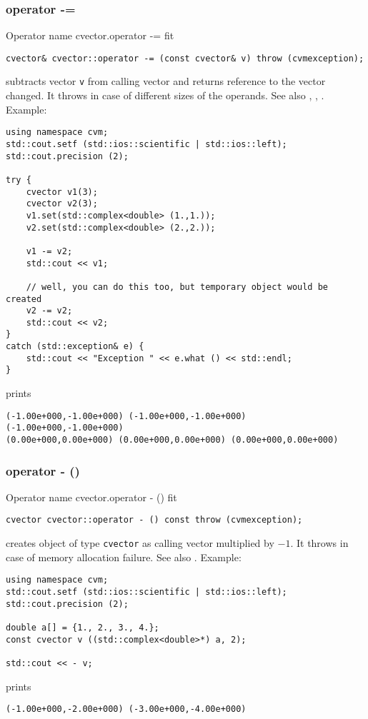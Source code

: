 \subsubsection{operator -=}
Operator%
\pdfdest name {cvector.operator -=} fit
\begin{verbatim}
cvector& cvector::operator -= (const cvector& v) throw (cvmexception);
\end{verbatim}
subtracts vector \verb"v" from  calling vector  
and returns  reference to
the vector changed.
It throws  
in case of different sizes of the operands.
See also ,
,
.
Example:
\begin{Verbatim}
using namespace cvm;
std::cout.setf (std::ios::scientific | std::ios::left);
std::cout.precision (2);

try {
    cvector v1(3);
    cvector v2(3);
    v1.set(std::complex<double> (1.,1.));
    v2.set(std::complex<double> (2.,2.));

    v1 -= v2;
    std::cout << v1;

    // well, you can do this too, but temporary object would be created
    v2 -= v2;
    std::cout << v2;
}
catch (std::exception& e) {
    std::cout << "Exception " << e.what () << std::endl;
}
\end{Verbatim}
prints
\begin{Verbatim}
(-1.00e+000,-1.00e+000) (-1.00e+000,-1.00e+000) (-1.00e+000,-1.00e+000)
(0.00e+000,0.00e+000) (0.00e+000,0.00e+000) (0.00e+000,0.00e+000)
\end{Verbatim}
\newpage



\subsubsection{operator - ()}
Operator%
\pdfdest name {cvector.operator - ()} fit
\begin{verbatim}
cvector cvector::operator - () const throw (cvmexception);
\end{verbatim}
creates  object of type \verb"cvector" as
 calling vector multiplied by $-1$.
It throws  
in case of memory allocation failure.
See also .
Example:
\begin{Verbatim}
using namespace cvm;
std::cout.setf (std::ios::scientific | std::ios::left);
std::cout.precision (2);

double a[] = {1., 2., 3., 4.};
const cvector v ((std::complex<double>*) a, 2);

std::cout << - v;
\end{Verbatim}
prints
\begin{Verbatim}
(-1.00e+000,-2.00e+000) (-3.00e+000,-4.00e+000)
\end{Verbatim}
\newpage



